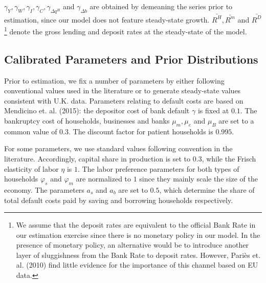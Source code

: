 \documentclass[12pt]{article}
\numberwithin{equation}{section}
\begin{document}
$\gamma_Y,\gamma_W,\gamma_I,\gamma_C,\gamma_{\Delta q^H} $ and $\gamma_{\Delta b}$ are obtained by demeaning the series prior to estimation, since our model does not feature steady-state growth. $\bar{R^H}, \bar{R^m}$ and $\bar{R^D}$\footnote{We assume that the deposit rates are equivalent to the official Bank Rate in our estimation exercise since there is no monetary policy in our model. In the presence of monetary policy, an alternative would be to introduce another layer of sluggishness from the Bank Rate to deposit rates. However, Pariès et. al. (2010) find little evidence for the importance of this channel based on EU data.} denote the gross lending and deposit rates at the steady-state of the model.  

\subsection{Calibrated Parameters and Prior Distributions }

Prior to estimation, we fix a number of parameters by either following conventional values used in the literature or to generate steady-state values consistent with U.K. data. Parameters relating to default costs are based on Mendicino et. al. (2015): the depositor cost of bank default $\gamma$ is fixed at $0.1$. The bankruptcy cost of households, businesses and banks $\mu_m, \mu_e$ and $\mu_B$ are set to a common value of $0.3$. The discount factor for patient households is $0.995$. 


For some parameters, we use standard values following convention in the literature. Accordingly, capital share in production is set to $0.3$, while the Frisch elasticity of labor $\eta$ is $1$. The labor preference parameters for both types of households $\varphi_s$ and $\varphi_m$ are normalized to $1$ since they mainly scale the size of the economy. The parameters $a_s$ and $a_b$ are set to $0.5$, which determine the share of total default costs paid by saving and borrowing households respectively. 
\end{document}
